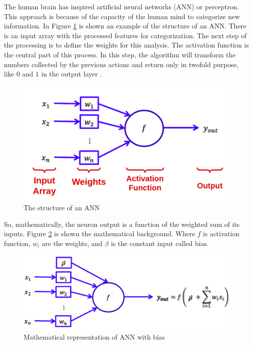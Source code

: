 The human brain has inspired artificial neural networks (ANN) or perceptron. This approach is because of the capacity of the human mind to categorize new information. In Figure \ref{fig:ann} is shown an example of the structure of an ANN. There is an input array with the processed features for categorization. The next step of the processing is to define the weights for this analysis. The activation function is the central part of this process. In this step, the algorithm will transform the numbers collected by the previous actions and return only in twofold purpose, like $0$ and $1$ in the output layer \cite{goodfellow2016deep}.

\begin{figure}[H]
\centering
\includegraphics[width=\columnwidth]{imagens/ann.png}
\caption{The structure of an ANN}
\label{fig:ann}
\end{figure}

So, mathematically, the neuron output is a function of the weighted sum of its inputs. Figure \ref{fig:ann_weight} is shown the mathematical background. Where $f$ is activation function, $w_i$ are the weights, and $\beta$ is the constant input called bias.


\begin{figure}[H]
\centering
\includegraphics[width=\columnwidth]{imagens/math_ann_bias.png}
\caption{Mathematical representation of ANN with bias}
\label{fig:ann_weight}
\end{figure}


